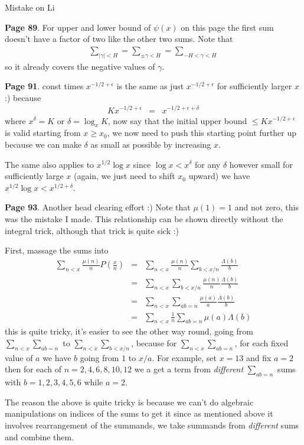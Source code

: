 \documentclass[aps,preprint,preprintnumbers,nofootinbib,showpacs,prd]{revtex4-1}
\newcommand{\nbea}{\begin{eqnarray*}}
\newcommand{\neea}{\end{eqnarray*}}
\begin{document}
Mistake on Li

{\bf Page 89}. For upper and lower bound of $\psi(x)$ on this page the first sum doesn't have a factor of two like the other two sums. Note that
%
\nbea
\sum_{|\gamma| < H} = \sum_{\pm \gamma < H} = \sum_{-H < \gamma < H}
\neea
%
so it already covers the negative values of $\gamma$.


{\bf Page 91}. const times $x^{-1/2 + \epsilon}$ is the same as just $x^{-1/2 + \epsilon}$ for sufficiently larger $x$ :) because
%
\nbea
K x^{-1/2 + \epsilon} & = & x^{-1/2 + \epsilon + \delta}
\neea
%
where $x^\delta = K$ or $\delta = \log_x K$, now say that the initial upper bound $\le K x^{-1/2 + \epsilon}$ is valid starting from $x \ge x_0$, we now need to push this starting point further up because we can make $\delta$ as small as possible by increasing $x$.

The same also applies to $x^{1/2} \log x$ since $\log x < x^\delta$ for any $\delta$ however small for sufficiently large $x$ (again, we just need to shift $x_0$ upward) we have $x^{1/2} \log x < x^{1/2 + \delta}$.


{\bf Page 93}. Another head clearing effort :)  Note that $\mu(1) = 1$ and not zero, this was the mistake I made. This relationship can be shown directly without the integral trick, although that trick is quite sick :)

First, massage the sums into
%
\nbea
\sum_{n < x} \frac{\mu(n)}{n} P\left(\frac{x}{n}\right) & = & \sum_{n<x}\frac{\mu(n)}{n} \sum_{b<x/n}\frac{\Lambda(b)}{b} \\
& = & \sum_{n<x}\sum_{b<x/n} \frac{\mu(n)}{n} \frac{\Lambda(b)}{b} \\
& = & \sum_{n<x}\sum_{ab=n} \frac{\mu(a)}{a} \frac{\Lambda(b)}{b} \\
& = & \sum_{n<x}\frac{1}{n}\sum_{ab=n} \mu(a) \Lambda(b)
\neea
%
this is quite tricky, it's easier to see the other way round, going from $\sum_{n<x}\sum_{ab=n}$ to $\sum_{n<x}\sum_{b<x/n}$, because for $\sum_{n<x}\sum_{ab=n}$, for each fixed value of $a$ we have $b$ going from $1$ to $x/a$. For example, set $x=13$ and fix $a = 2$ then for each of $n = 2, 4, 6, 8, 10, 12$ we a get a term from {\it different} $\sum_{ab = n}$ sums with $b = 1, 2, 3, 4, 5, 6$ while $a = 2$.

The reason the above is quite tricky is because we can't do algebraic manipulations on indices of the sums to get it since as mentioned above it involves rearrangement of the summands, we take summands from {\it different} sums and combine them.
\end{document}
